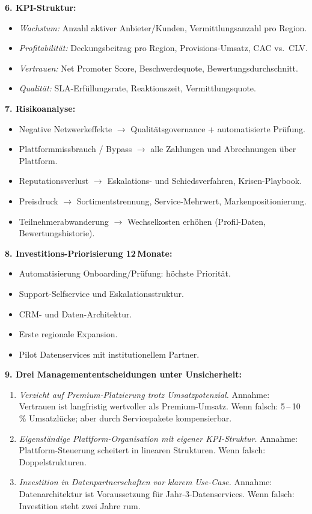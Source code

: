 \documentclass[11pt,a4paper,oneside]{article}
\begin{document}
\begin{loesungbox}
\textbf{6. KPI-Struktur:}
\begin{itemize}
  \item \emph{Wachstum:} Anzahl aktiver Anbieter/Kunden, Vermittlungsanzahl pro Region.
  \item \emph{Profitabilität:} Deckungsbeitrag pro Region, Provisions-Umsatz, CAC vs.\ CLV.
  \item \emph{Vertrauen:} Net Promoter Score, Beschwerdequote, Bewertungsdurchschnitt.
  \item \emph{Qualität:} SLA-Erfüllungsrate, Reaktionszeit, Vermittlungsquote.
\end{itemize}

\textbf{7. Risikoanalyse:}
\begin{itemize}
  \item Negative Netzwerkeffekte $\rightarrow$ Qualitätsgovernance + automatisierte Prüfung.
  \item Plattformmissbrauch / Bypass $\rightarrow$ alle Zahlungen und Abrechnungen über Plattform.
  \item Reputationsverlust $\rightarrow$ Eskalations- und Schiedsverfahren, Krisen-Playbook.
  \item Preisdruck $\rightarrow$ Sortimentstrennung, Service-Mehrwert, Markenpositionierung.
  \item Teilnehmerabwanderung $\rightarrow$ Wechselkosten erhöhen (Profil-Daten, Bewertungshistorie).
\end{itemize}

\textbf{8. Investitions-Priorisierung 12\,Monate:}
\begin{itemize}
  \item Automatisierung Onboarding/Prüfung: höchste Priorität.
  \item Support-Selfservice und Eskalationsstruktur.
  \item CRM- und Daten-Architektur.
  \item Erste regionale Expansion.
  \item Pilot Datenservices mit institutionellem Partner.
\end{itemize}

\textbf{9. Drei Managemententscheidungen unter Unsicherheit:}
\begin{enumerate}
  \item \emph{Verzicht auf Premium-Platzierung trotz Umsatzpotenzial.} Annahme: Vertrauen ist langfristig wertvoller als Premium-Umsatz. Wenn falsch: 5\,--\,10\,\% Umsatzlücke; aber durch Servicepakete kompensierbar.
  \item \emph{Eigenständige Plattform-Organisation mit eigener KPI-Struktur.} Annahme: Plattform-Steuerung scheitert in linearen Strukturen. Wenn falsch: Doppelstrukturen.
  \item \emph{Investition in Datenpartnerschaften vor klarem Use-Case.} Annahme: Datenarchitektur ist Voraussetzung für Jahr-3-Datenservices. Wenn falsch: Investition steht zwei Jahre rum.
\end{enumerate}


\end{loesungbox}
\end{document}
